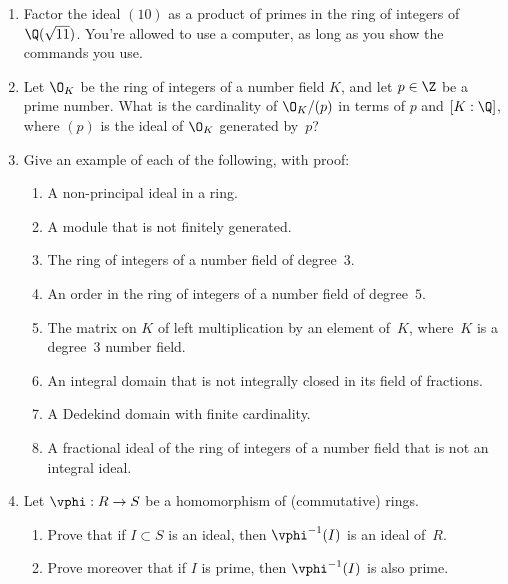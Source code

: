 \begin{enumerate}
\item Factor the ideal $(10)$ as a product of primes
in the ring of integers of $\Q(\sqrt{11})$.  You're allowed
to use a computer, as long as you show the commands you use.

\item Let $\O_K$ be the ring of integers of a number field $K$,
and let $p\in\Z$ be a prime number.  What is the cardinality
of $\O_K/(p)$ in terms of $p$ and $[K:\Q]$, 
where $(p)$ is the ideal of $\O_K$ generated by~$p$?

\item Give an example of each of the following, with proof:
\begin{enumerate}
\item A non-principal ideal in a ring.
\item A module that is not finitely generated.
\item The ring of integers of a number field of degree~$3$.
\item An order in the ring of integers of a number field of degree~$5$.
\item The matrix on $K$ of left multiplication by an element of~$K$,
where~$K$ is a degree~$3$ number field.
\item An integral domain that is not integrally closed in its field of fractions.
\item A Dedekind domain with finite cardinality.
\item A fractional ideal of the ring of integers of a number
field that is not an integral ideal.
\end{enumerate}



\item Let $\vphi:R\to S$ be a homomorphism of (commutative) rings.
\begin{enumerate}
\item Prove that if $I\subset S$ is an ideal, then $\vphi^{-1}(I)$
is an ideal of~$R$.
\item Prove moreover that if $I$ is prime, then $\vphi^{-1}(I)$ is
also prime. 
\end{enumerate}


\end{enumerate}
